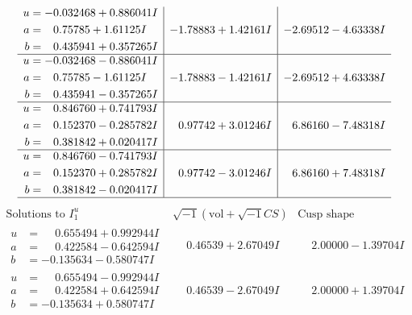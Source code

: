 \documentclass[1p]{elsarticle_modified}
\theoremstyle{definition}
\newcommand{\I}{\sqrt{-1}}
\begin{document}
$$\begin{array}{c|c|c}
\begin{aligned}
u &= -0.032468 + 0.886041 I \\
a &= \phantom{-}0.75785 + 1.61125 I \\
b &= \phantom{-}0.435941 + 0.357265 I\end{aligned}
 & -1.78883 + 1.42161 I & -2.69512 - 4.63338 I \\ \hline\begin{aligned}
u &= -0.032468 - 0.886041 I \\
a &= \phantom{-}0.75785 - 1.61125 I \\
b &= \phantom{-}0.435941 - 0.357265 I\end{aligned}
 & -1.78883 - 1.42161 I & -2.69512 + 4.63338 I \\ \hline\begin{aligned}
u &= \phantom{-}0.846760 + 0.741793 I \\
a &= \phantom{-}0.152370 - 0.285782 I \\
b &= \phantom{-}0.381842 + 0.020417 I\end{aligned}
 & \phantom{-}0.97742 + 3.01246 I & \phantom{-}6.86160 - 7.48318 I \\ \hline\begin{aligned}
u &= \phantom{-}0.846760 - 0.741793 I \\
a &= \phantom{-}0.152370 + 0.285782 I \\
b &= \phantom{-}0.381842 - 0.020417 I\end{aligned}
 & \phantom{-}0.97742 - 3.01246 I & \phantom{-}6.86160 + 7.48318 I\\
 \hline 
 \end{array}$$\newpage$$\begin{array}{c|c|c}  
\text{Solutions to }I^u_{1}& \I (\text{vol} + \sqrt{-1}CS) & \text{Cusp shape}\\
 \hline 
\begin{aligned}
u &= \phantom{-}0.655494 + 0.992944 I \\
a &= \phantom{-}0.422584 - 0.642594 I \\
b &= -0.135634 - 0.580747 I\end{aligned}
 & \phantom{-}0.46539 + 2.67049 I & \phantom{-}2.00000 - 1.39704 I \\ \hline\begin{aligned}
u &= \phantom{-}0.655494 - 0.992944 I \\
a &= \phantom{-}0.422584 + 0.642594 I \\
b &= -0.135634 + 0.580747 I\end{aligned}
 & \phantom{-}0.46539 - 2.67049 I & \phantom{-}2.00000 + 1.39704 I \\ \hline\begin{aligned}

\end{aligned}
\end{array}$$
\end{document}
